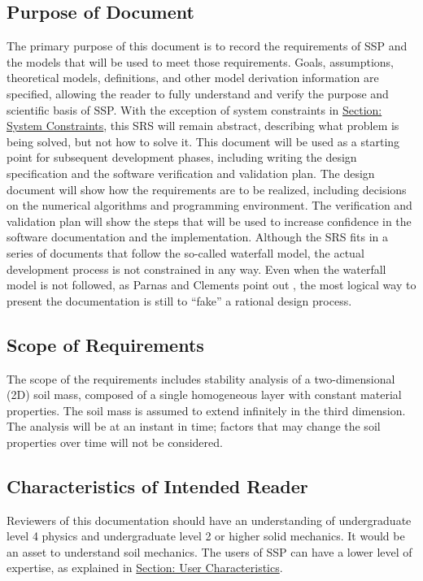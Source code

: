 \documentclass[12pt]{article}
\begin{document}
\subsection{Purpose of Document}
\label{Sec:DocPurpose}
The primary purpose of this document is to record the requirements of SSP and the models that will be used to meet those requirements. Goals, assumptions, theoretical models, definitions, and other model derivation information are specified, allowing the reader to fully understand and verify the purpose and scientific basis of SSP. With the exception of system constraints in \hyperref[Sec:SysConstraints]{Section: System Constraints}, this SRS will remain abstract, describing what problem is being solved, but not how to solve it.
This document will be used as a starting point for subsequent development phases, including writing the design specification and the software verification and validation plan. The design document will show how the requirements are to be realized, including decisions on the numerical algorithms and programming environment. The verification and validation plan will show the steps that will be used to increase confidence in the software documentation and the implementation. Although the SRS fits in a series of documents that follow the so-called waterfall model, the actual development process is not constrained in any way. Even when the waterfall model is not followed, as Parnas and Clements point out \cite{parnasClements1986}, the most logical way to present the documentation is still to ``fake'' a rational design process.
\subsection{Scope of Requirements}
\label{Sec:ReqsScope}
The scope of the requirements includes stability analysis of a two-dimensional (2D) soil mass, composed of a single homogeneous layer with constant material properties. The soil mass is assumed to extend infinitely in the third dimension. The analysis will be at an instant in time; factors that may change the soil properties over time will not be considered.
\subsection{Characteristics of Intended Reader}
\label{Sec:ReaderChars}
Reviewers of this documentation should have an understanding of undergraduate level 4 physics and undergraduate level 2 or higher solid mechanics. It would be an asset to understand soil mechanics. The users of SSP can have a lower level of expertise, as explained in \hyperref[Sec:UserChars]{Section: User Characteristics}.
\end{document}
